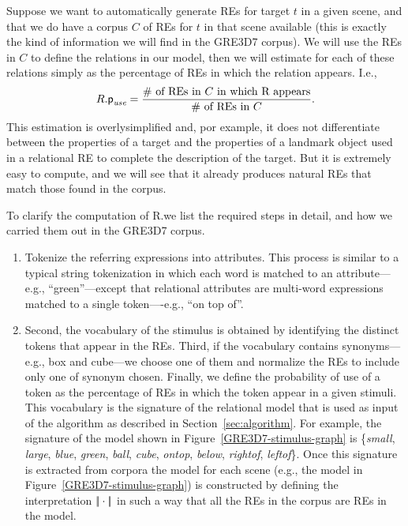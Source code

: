 Suppose we want to automatically generate REs for target $t$ in a given scene, and that we do have a corpus $C$ of REs for $t$ in that scene available (this is exactly the kind of information we will find in the GRE3D7 corpus).  We will use the REs in $C$ to define the relations 
in our model, then we will estimate \puse for each of these relations simply as the percentage of REs in which the relation appears.  I.e., 
$$
R.\textsf{p}_\textit{use} = \frac{\# \mbox{ of REs in $C$ in which R appears}}{\# \mbox{ of REs in $C$}}.
$$
This estimation is overlysimplified and, por example, it does not differentiate between the properties of a target and the properties of a landmark object used in a relational RE to complete the description of the target.  But it is extremely easy to compute, and we will see that 
it already produces natural REs that match those found in the corpus. 

To clarify the computation of R.\puse we list the required steps in detail, and how we carried them out in the GRE3D7 corpus.

\begin{enumerate}
\item Tokenize the referring expressions into attributes. This process is similar to a typical string tokenization in which each word is matched to an attribute---e.g., ``green''---except that relational attributes are multi-word expressions matched to a single token----e.g., ``on top of''. 
\item Second, the vocabulary of the stimulus is obtained by identifying the distinct tokens that appear in the REs. Third, if the vocabulary contains synonyms---e.g., box and cube---we choose one of them and normalize the REs to include only one of synonym chosen. Finally, we define the probability of use of a token as the percentage of REs in which the token appear in a given stimuli. This vocabulary is the signature of the relational model that is used as input of the algorithm as described in Section~\ref{sec:algorithm}. For example, the signature of the model shown in Figure~\ref{GRE3D7-stimulus-graph} is \{\emph{small}, \emph{large}, \emph{blue}, \emph{green}, \emph{ball}, \emph{cube}, \emph{ontop}, \emph{below}, \emph{rightof}, \emph{leftof}\}. Once this signature is extracted from corpora the model for each scene (e.g., the model in Figure~\ref{GRE3D7-stimulus-graph}) is constructed by defining the interpretation $|\!|\cdot|\!|$ in such a way that all the REs in the corpus are REs in the model. 
\end{enumerate}

